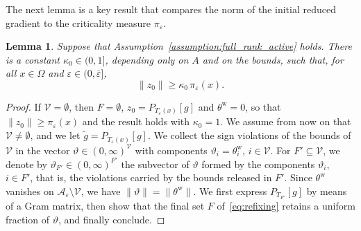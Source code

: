 \documentclass{article}
\numberwithin{equation}{section}
\newcommand{\calA}{{\mathcal{A}}}
\newcommand{\proj}[2]{P_{#1} \left[ {#2} \right]} %
\theoremstyle{plain}
\newtheorem{lemma}[theorem]{Lemma}
\begin{document}
The next lemma is a key result that compares the norm of the initial reduced gradient to the criticality measure $\pi_{\varepsilon}$.
\begin{lemma}\label{lemma:initial_direction}
	Suppose that Assumption~\ref{assumption:full_rank_active} holds. There is a constant $\kappa_0 \in (0,1]$, depending only on $A$ and on the bounds, such that, for all $x \in \Omega$ and $\varepsilon \in (0,\bar\varepsilon]$,
	\[\|z_0\| \ge \kappa_0\,\pi_\varepsilon(x).\]
\end{lemma}
\begin{proof}
	If $\mathcal{V} = \emptyset$, then $F = \emptyset$, $z_0 = \proj{T_\varepsilon(x)}{g}$ and $\theta^{\mathrm{w}} = 0$, so that $\|z_0\| \ge \pi_\varepsilon(x)$ and the result holds with $\kappa_0 = 1$. We assume from now on that $\mathcal{V} \ne \emptyset$, and we let $\tilde{g} = \proj{T_\varepsilon(x)}{g}$. We collect the sign violations of the bounds of $\mathcal{V}$ in the vector $\vartheta \in (0,\infty)^{\mathcal{V}}$ with components $\vartheta_i = \theta^{\mathrm{w}}_i$, $i \in \mathcal{V}$. For $F' \subseteq \mathcal{V}$, we denote by $\vartheta_{F'} \in (0,\infty)^{F'}$ the subvector of $\vartheta$ formed by the components $\vartheta_i$, $i \in F'$, that is, the violations carried by the bounds released in $F'$. Since $\theta^{\mathrm{w}}$ vanishes on $\calA_\varepsilon\setminus\mathcal{V}$, we have $\|\vartheta\| = \|\theta^{\mathrm{w}}\|$. We first express $\proj{T_{F'}}{g}$ by means of a Gram matrix, then show that the final set $F$ of~\eqref{eq:refixing} retains a uniform fraction of $\vartheta$, and finally conclude.


\end{proof}
\end{document}
